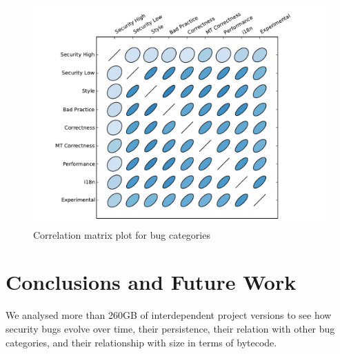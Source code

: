 \documentclass[letterpaper,twocolumn,10pt]{article}
\begin{document}
%    

\begin{figure}[t]
  \centering
  \includegraphics[scale=0.43]{corrplot.pdf}
  \caption{Correlation matrix plot for bug categories}
  \label{fig:corrplot}
\end{figure}

\section{Conclusions and Future Work}
\label{sec:con}

We analysed more than 260GB of interdependent project versions to see
how security bugs evolve over time, their persistence, their relation
with other bug categories, and their relationship with size in terms
of bytecode.
\end{document}
